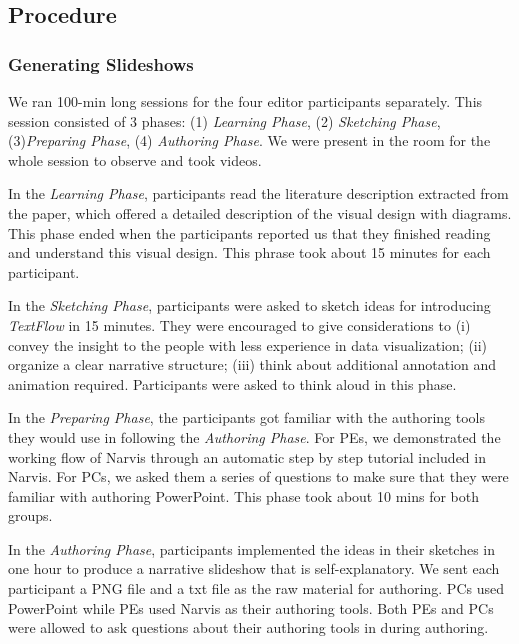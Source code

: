 
\subsection{Procedure}
\subsubsection{Generating Slideshows}
We ran 100-min long sessions for the four editor participants separately. This session consisted of 3 phases: (1) \textit{Learning Phase}, (2) \textit{Sketching Phase}, (3)\textit{Preparing Phase}, (4) \textit{Authoring Phase}. We were present in the room for the whole session to observe and took videos. 

In the \textit{Learning Phase}, participants read the literature description extracted from the paper, which offered a detailed description of the visual design with diagrams. This phase ended when the participants reported us that they finished reading and understand this visual design. 
This phrase took about 15 minutes for each participant.

In the \textit{Sketching Phase}, participants were asked to sketch ideas for introducing \textit{TextFlow} in 15 minutes. They were encouraged to give considerations to (i) convey the insight to the people with less experience in data visualization; (ii) organize a clear narrative structure; (iii) think about additional annotation and animation required. Participants were asked to think aloud in this phase. 

In the \textit{Preparing Phase}, the participants got familiar with the authoring tools they would use in following the \textit{Authoring Phase}. For PEs, we demonstrated the working flow of Narvis through an automatic step by step tutorial included in Narvis. For PCs, we asked them a series of questions to make sure that they were familiar with authoring PowerPoint. This phase took about 10 mins for both groups.  

In the \textit{Authoring Phase}, participants implemented the ideas in their sketches in one hour to produce a narrative slideshow that is self-explanatory. 
We sent each participant a PNG file and a txt file as the raw material for authoring. PCs used PowerPoint while PEs used Narvis as their authoring tools. Both PEs and PCs were allowed to ask questions about their authoring tools in during authoring. 


